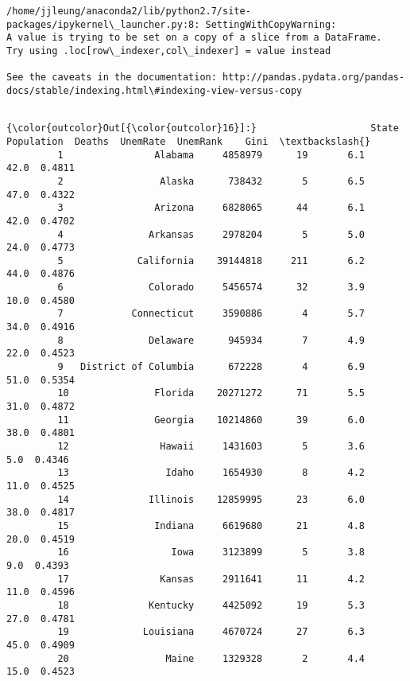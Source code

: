 \documentclass[11pt]{article}
\begin{document}
    \begin{Verbatim}[commandchars=\\\{\}]
/home/jjleung/anaconda2/lib/python2.7/site-packages/ipykernel\_launcher.py:8: SettingWithCopyWarning: 
A value is trying to be set on a copy of a slice from a DataFrame.
Try using .loc[row\_indexer,col\_indexer] = value instead

See the caveats in the documentation: http://pandas.pydata.org/pandas-docs/stable/indexing.html\#indexing-view-versus-copy
  

    \end{Verbatim}

\begin{Verbatim}[commandchars=\\\{\}]
{\color{outcolor}Out[{\color{outcolor}16}]:}                    State  Population  Deaths  UnemRate  UnemRank    Gini  \textbackslash{}
         1                Alabama     4858979      19       6.1      42.0  0.4811   
         2                 Alaska      738432       5       6.5      47.0  0.4322   
         3                Arizona     6828065      44       6.1      42.0  0.4702   
         4               Arkansas     2978204       5       5.0      24.0  0.4773   
         5             California    39144818     211       6.2      44.0  0.4876   
         6               Colorado     5456574      32       3.9      10.0  0.4580   
         7            Connecticut     3590886       4       5.7      34.0  0.4916   
         8               Delaware      945934       7       4.9      22.0  0.4523   
         9   District of Columbia      672228       4       6.9      51.0  0.5354   
         10               Florida    20271272      71       5.5      31.0  0.4872   
         11               Georgia    10214860      39       6.0      38.0  0.4801   
         12                Hawaii     1431603       5       3.6       5.0  0.4346   
         13                 Idaho     1654930       8       4.2      11.0  0.4525   
         14              Illinois    12859995      23       6.0      38.0  0.4817   
         15               Indiana     6619680      21       4.8      20.0  0.4519   
         16                  Iowa     3123899       5       3.8       9.0  0.4393   
         17                Kansas     2911641      11       4.2      11.0  0.4596   
         18              Kentucky     4425092      19       5.3      27.0  0.4781   
         19             Louisiana     4670724      27       6.3      45.0  0.4909   
         20                 Maine     1329328       2       4.4      15.0  0.4523   

\end{Verbatim}
\end{document}
